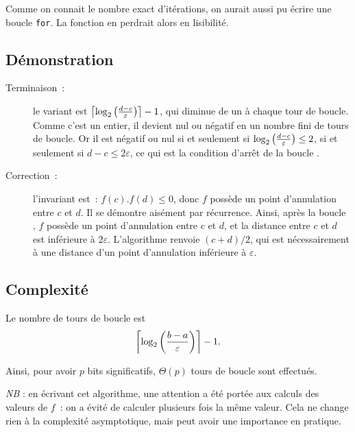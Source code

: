 \begin{rem}
  Comme on connait le nombre exact d'itérations, on aurait aussi pu écrire une boucle \texttt{for}. La fonction en perdrait alors en lisibilité. 
\end{rem}

\subsection{Démonstration}

\begin{description}
\item[Terminaison~:] le variant est $\left\lceil\log_{2}\left( \frac{d-c}{\varepsilon}\right)\right\rceil - 1$, qui diminue de un à chaque tour de 
boucle. Comme c'est un entier, il devient nul ou négatif en un nombre fini de tours de boucle. Or il est négatif ou nul 
si et seulement si $\log_{2}\left( \frac{d-c}{\varepsilon}\right)\leq 2$, si et seulement si $d-c \leq 2\varepsilon$, ce qui est 
la condition d'arrêt de la boucle .
\item[Correction~:] l'invariant est~: \og $f(c).f(d)\leq 0$, donc $f$ possède un point d'annulation entre $c$ et $d$\fg. Il 
se démontre aisément par récurrence. Ainsi, après la boucle , $f$ possède un point d'annulation entre $c$ 
et $d$, et la distance entre $c$ et $d$ est inférieure à $2\varepsilon$. L'algorithme renvoie $(c+d)/2$, qui est 
nécessairement à une distance d'un point d'annulation inférieure à $\varepsilon$.
\end{description}



\subsection{Complexité}

Le nombre de tours de boucle est
\begin{equation*}
  \left\lceil\log_{2}\left( \frac{b-a}{\varepsilon}\right)\right\rceil - 1.
\end{equation*}

Ainsi, pour avoir $p$ bits significatifs, $\Theta(p)$ tours de
boucle sont effectués.

\emph{NB} : en écrivant cet algorithme, une attention a été portée aux calculs des valeurs de $f$~: on a évité de calculer 
plusieurs fois la même valeur. Cela ne change rien à la complexité asymptotique, mais peut avoir une importance en 
pratique.


